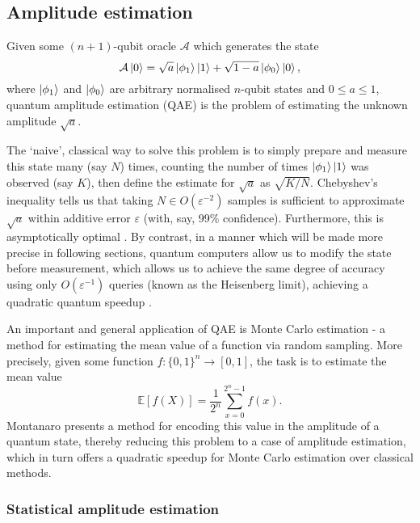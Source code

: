 \subsection{Amplitude estimation}

\begin{problem}
	Given some $(n+1)$-qubit oracle $\mathcal{A}$ which generates the state
	\[
	\mathcal{A} \ket{0} = \sqrt{a} \ket{\phi_1} \ket{1} + \sqrt{1-a} \ket{\phi_0} \ket{0},
	\]
	where $\ket{\phi_1}$ and $\ket{\phi_0}$ are arbitrary normalised $n$-qubit states and $0 \leq a \leq  1$, quantum amplitude estimation (QAE) is the problem of estimating the unknown amplitude $\sqrt{a}$.
\end{problem}

The `naive', classical way to solve this problem is to simply prepare and measure this state many (say $N$) times, counting the number of times $\ket{\phi_1}\ket{1}$ was observed (say $K$), then define the estimate for $\sqrt{a}$ as $\sqrt{K/N}$. Chebyshev's inequality tells us that taking $N \in O(\varepsilon^{-2})$ samples is sufficient to approximate $\sqrt{a}$ within additive error $\varepsilon$ (with, say, 99\% confidence). Furthermore, this is asymptotically optimal \cite{dagum_2000_opt_alg_for_MC_est}. By contrast, in a manner which will be made more precise in following sections, quantum computers allow us to modify the state before measurement, which allows us to achieve the same degree of accuracy using only $O(\varepsilon^{-1})$ queries (known as the Heisenberg limit), achieving a quadratic quantum speedup \cite{brassard_2002_q_amp_amp}.

An important and general application of QAE is Monte Carlo estimation \cite{heinrich_2002_q_sum_for_integration, montanaro_2015_q_MC_methods, suzuki_2020_amp_without_phase} - a method for estimating the mean value of a function via random sampling. More precisely, given some function $f : \{0,1\}^n \rightarrow [0,1]$, the task is to estimate the mean value
\[
\mathbb{E}[f(X)] = \frac{1}{2^n} \sum_{x=0}^{2^n-1} {f(x)}.
\]
Montanaro \cite{montanaro_2015_q_MC_methods} presents a method for encoding this value in the amplitude of a quantum state, thereby reducing this problem to a case of amplitude estimation, which in turn offers a quadratic speedup for Monte Carlo estimation over classical methods.

\subsubsection{Statistical amplitude estimation}

